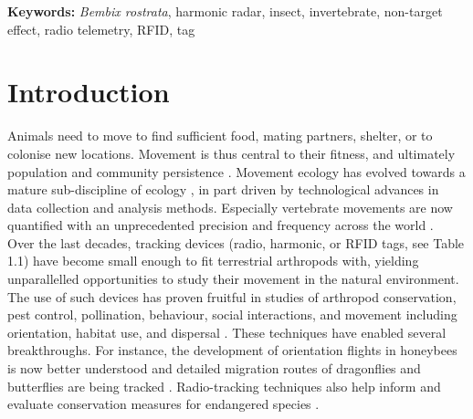\documentclass[10pt, twoside]{book} %
\begin{document}
\vspace*{\fill}
\noindent \textbf{Keywords:} \textit{Bembix rostrata}, harmonic radar, insect, invertebrate, non-target effect, radio telemetry, RFID, tag
	
\clearpage
	
	\section{Introduction}
	
	Animals need to move to find sufficient food, mating partners, shelter, or to colonise new locations. Movement is thus central to their fitness, and ultimately population and community persistence \citep{jeltsch2013, bonte2017}. Movement ecology has evolved towards a mature sub-discipline of ecology \citep{nathan2013}, in part driven by technological advances in data collection and analysis methods. Especially vertebrate movements are now quantified with an unprecedented precision and frequency across the world \citep{kays2015}.\\
	
	Over the last decades, tracking devices (radio, harmonic, or RFID tags, see Table 1.1) have become small enough to fit terrestrial arthropods with, yielding unparallelled opportunities to study their movement in the natural environment. The use of such devices has proven fruitful in studies of arthropod conservation, pest control, pollination, behaviour, social interactions, and movement including orientation, habitat use, and dispersal \citep{kissling2014}. These techniques have enabled several breakthroughs. For instance, the development of orientation flights in honeybees is now better understood \citep{capaldi2000} and detailed migration routes of dragonflies and butterflies are being tracked \citep{wikelski2006, knight2019}. Radio-tracking techniques also help inform and evaluate conservation measures for endangered species \citep[e.g.][]{hedin2002, stringer2008, kelly2010}.\\
	
\end{document}

